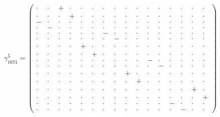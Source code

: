 \documentclass[
  10pt,
]{article}
\begin{document}
\[\gamma_{1671}^5=\left(\begin{smallmatrix} \cdot & \cdot & + & \cdot & \cdot & \cdot & \cdot & \cdot & \cdot & \cdot & \cdot & \cdot & \cdot & \cdot & \cdot & \cdot \\ \cdot & \cdot & \cdot & + & \cdot & \cdot & \cdot & \cdot & \cdot & \cdot & \cdot & \cdot & \cdot & \cdot & \cdot & \cdot \\ - & \cdot & \cdot & \cdot & \cdot & \cdot & \cdot & \cdot & \cdot & \cdot & \cdot & \cdot & \cdot & \cdot & \cdot & \cdot \\ \cdot & - & \cdot & \cdot & \cdot & \cdot & \cdot & \cdot & \cdot & \cdot & \cdot & \cdot & \cdot & \cdot & \cdot & \cdot \\ \cdot & \cdot & \cdot & \cdot & \cdot & \cdot & - & \cdot & \cdot & \cdot & \cdot & \cdot & \cdot & \cdot & \cdot & \cdot \\ \cdot & \cdot & \cdot & \cdot & \cdot & \cdot & \cdot & - & \cdot & \cdot & \cdot & \cdot & \cdot & \cdot & \cdot & \cdot \\ \cdot & \cdot & \cdot & \cdot & + & \cdot & \cdot & \cdot & \cdot & \cdot & \cdot & \cdot & \cdot & \cdot & \cdot & \cdot \\ \cdot & \cdot & \cdot & \cdot & \cdot & + & \cdot & \cdot & \cdot & \cdot & \cdot & \cdot & \cdot & \cdot & \cdot & \cdot \\ \cdot & \cdot & \cdot & \cdot & \cdot & \cdot & \cdot & \cdot & \cdot & \cdot & - & \cdot & \cdot & \cdot & \cdot & \cdot \\ \cdot & \cdot & \cdot & \cdot & \cdot & \cdot & \cdot & \cdot & \cdot & \cdot & \cdot & - & \cdot & \cdot & \cdot & \cdot \\ \cdot & \cdot & \cdot & \cdot & \cdot & \cdot & \cdot & \cdot & + & \cdot & \cdot & \cdot & \cdot & \cdot & \cdot & \cdot \\ \cdot & \cdot & \cdot & \cdot & \cdot & \cdot & \cdot & \cdot & \cdot & + & \cdot & \cdot & \cdot & \cdot & \cdot & \cdot \\ \cdot & \cdot & \cdot & \cdot & \cdot & \cdot & \cdot & \cdot & \cdot & \cdot & \cdot & \cdot & \cdot & \cdot & + & \cdot \\ \cdot & \cdot & \cdot & \cdot & \cdot & \cdot & \cdot & \cdot & \cdot & \cdot & \cdot & \cdot & \cdot & \cdot & \cdot & + \\ \cdot & \cdot & \cdot & \cdot & \cdot & \cdot & \cdot & \cdot & \cdot & \cdot & \cdot & \cdot & - & \cdot & \cdot & \cdot \\ \cdot & \cdot & \cdot & \cdot & \cdot & \cdot & \cdot & \cdot & \cdot & \cdot & \cdot & \cdot & \cdot & - & \cdot & \cdot \end{smallmatrix}\right)\]
\end{document}
